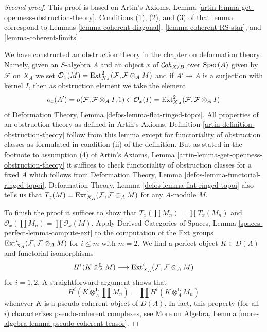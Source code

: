 \begin{proof}[Second proof]
This proof is based on
Artin's Axioms, Lemma \ref{artin-lemma-get-openness-obstruction-theory}.
Conditions (1), (2), and (3) of that lemma correspond to
Lemmas \ref{lemma-coherent-diagonal},
\ref{lemma-coherent-RS-star}, and
\ref{lemma-coherent-limits}.

\medskip\noindent
We have constructed an obstruction theory in the chapter on
deformation theory. Namely, given an $S$-algebra $A$ and an
object $x$ of $\mathcal{C}\!\mathit{oh}_{X/B}$ over $\mathop{\mathrm{Spec}}(A)$ given
by $\mathcal{F}$ on $X_A$ we set
$\mathcal{O}_x(M) = \mathop{\mathrm{Ext}}\nolimits^2_{X_A}(\mathcal{F}, \mathcal{F} \otimes_A M)$
and if $A' \to A$ is a surjection with kernel $I$, then as obstruction
element we take the element
$$
o_x(A') = o(\mathcal{F}, \mathcal{F} \otimes_A I, 1) \in
\mathcal{O}_x(I) = \mathop{\mathrm{Ext}}\nolimits^2_{X_A}(\mathcal{F}, \mathcal{F} \otimes_A I)
$$
of Deformation Theory, Lemma \ref{defos-lemma-flat-ringed-topoi}.
All properties of an obstruction theory as defined in
Artin's Axioms, Definition \ref{artin-definition-obstruction-theory}
follow from this lemma except for functoriality of obstruction classes
as formulated in condition (ii) of the definition. But as stated in
the footnote to assumption (4) of
Artin's Axioms, Lemma \ref{artin-lemma-get-openness-obstruction-theory}
it suffices to check functoriality of obstruction classes
for a fixed $A$ which follows from
Deformation Theory, Lemma \ref{defos-lemma-functorial-ringed-topoi}.
Deformation Theory, Lemma \ref{defos-lemma-flat-ringed-topoi}
also tells us that
$T_x(M) = \mathop{\mathrm{Ext}}\nolimits^1_{X_A}(\mathcal{F}, \mathcal{F} \otimes_A M)$
for any $A$-module $M$.

\medskip\noindent
To finish the proof it suffices to show that
$T_x(\prod M_n) = \prod T_x(M_n)$ and
$\mathcal{O}_x(\prod M_n) = \prod \mathcal{O}_x(M)$.
Apply Derived Categories of Spaces, Lemma
\ref{spaces-perfect-lemma-compute-ext}
to the computation of the Ext groups
$\mathop{\mathrm{Ext}}\nolimits^i_{X_A}(\mathcal{F}, \mathcal{F} \otimes_A M)$
for $i \leq m$ with $m = 2$. We find a perfect object $K \in D(A)$
and functorial isomorphisms
$$
H^i(K \otimes_A^\mathbf{L} M)
\longrightarrow
\mathop{\mathrm{Ext}}\nolimits^i_{X_A}(\mathcal{F}, \mathcal{F} \otimes_A M)
$$
for $i = 1, 2$. A straightforward argument shows that
$$
H^i(K \otimes_A^\mathbf{L} \prod M_n) =
\prod H^i(K \otimes_A^\mathbf{L} M_n)
$$
whenever $K$ is a pseudo-coherent object of $D(A)$.
In fact, this property (for all $i$) characterizes
pseudo-coherent complexes, see
More on Algebra, Lemma \ref{more-algebra-lemma-pseudo-coherent-tensor}.
\end{proof}

